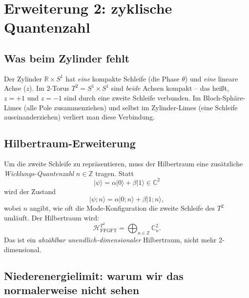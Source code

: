 \section{\texorpdfstring{Erweiterung 2: zyklische Quantenzahl}{Erweiterung 2: zyklische Quantenzahl}}

\subsection{Was beim Zylinder fehlt}

Der Zylinder $\mathbb{R} \times S^1$ hat \emph{eine} kompakte
Schleife (die Phase $\theta$) und \emph{eine} lineare Achse ($z$). Im
2-Torus $T^2 = S^1 \times S^1$ sind \emph{beide} Achsen kompakt --
das heißt, $z = +1$ und $z = -1$ sind durch eine zweite Schleife
verbunden. Im Bloch-Sphäre-Limes (alle Pole zusammenziehen) und
selbst im Zylinder-Limes (eine Schleife auseinanderziehen) verliert
man diese Verbindung.

\subsection{Hilbertraum-Erweiterung}

Um die zweite Schleife zu repräsentieren, muss der Hilbertraum eine
zusätzliche \emph{Wicklungs-Quantenzahl} $n \in \mathbb{Z}$ tragen.
Statt
\begin{equation}
  |\psi\rangle = \alpha|0\rangle + \beta|1\rangle \in \mathbb{C}^2
\end{equation}
wird der Zustand
\begin{equation}
  |\psi; n\rangle = \alpha|0; n\rangle + \beta|1; n\rangle,
\end{equation}
wobei $n$ angibt, wie oft die Mode-Konfiguration die zweite
Schleife des $T^2$ umläuft. Der Hilbertraum wird:
\begin{equation}
  \boxed{
    \mathcal{H}^{T^2}_{\text{FFGFT}}
    = \bigoplus_{n \in \mathbb{Z}} \mathbb{C}^2_n.
  }
\end{equation}
Das ist ein \emph{abzählbar unendlich-dimensionaler} Hilbertraum,
nicht mehr 2-dimensional.

\subsection{Niederenergielimit: warum wir das normalerweise nicht sehen}

